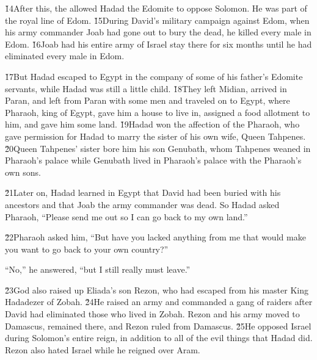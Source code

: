 \v{14}After this, the  allowed Hadad the Edomite to oppose Solomon. He was part of the royal line of Edom. \v{15}During David's military campaign against Edom, when his army commander Joab had gone out to bury the dead, he killed every male in Edom. \v{16}Joab had his entire army of Israel stay there for six months until he had eliminated every male in Edom.

\v{17}But Hadad escaped to Egypt in the company of some of his father's Edomite servants, while Hadad was still a little child. \v{18}They left Midian, arrived in Paran, and left from Paran with some men and traveled on to Egypt, where Pharaoh, king of Egypt, gave him a house to live in, assigned a food allotment to him, and gave him some land. \v{19}Hadad won the affection of the Pharaoh, who gave permission for Hadad to marry the sister of his own wife, Queen Tahpenes. \v{20}Queen Tahpenes' sister bore him his son Genubath, whom Tahpenes weaned in Pharaoh's palace while Genubath lived in Pharaoh's palace with the Pharaoh's own sons.

\v{21}Later on, Hadad learned in Egypt that David had been buried with his ancestors and that Joab the army commander was dead. So Hadad asked Pharaoh, ``Please send me out so I can go back to my own land.''

\v{22}Pharaoh asked him, ``But have you lacked anything from me that would make you want to go back to your own country?''

``No,'' he answered, ``but I still really must leave.''

\v{23}God also raised up Eliada's son Rezon, who had escaped from his master King Hadadezer of Zobah. \v{24}He raised an army and commanded a gang of raiders after David had eliminated those who lived in Zobah. Rezon and his army moved to Damascus, remained there, and Rezon ruled from Damascus. \v{25}He opposed Israel during Solomon's entire reign, in addition to all of the evil things that Hadad did. Rezon also hated Israel while he reigned over Aram.

